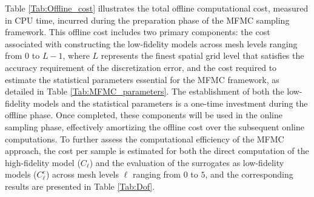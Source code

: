 Table \ref{Tab:Offline_cost} illustrates the total offline computational cost, measured in CPU time, incurred during the preparation phase of the MFMC sampling framework. This offline cost includes two primary components: the cost associated with constructing the low-fidelity models across mesh levels ranging from $0$ to $L-1$, where $L$ represents the finest spatial grid level that satisfies the accuracy requirement of the discretization error, and the cost required to estimate the statistical parameters essential for the MFMC framework, as detailed in Table \ref{Tab:MFMC_parameters}. The establishment of both the low-fidelity models and the statistical parameters is a one-time investment during the offline phase. Once completed, these components will be used in the online sampling phase, effectively amortizing the offline cost over the subsequent online computations. To further assess the computational efficiency of the MFMC approach, the cost per sample is estimated for both the direct computation of the high-fidelity model ($C_\ell$) and the evaluation of the surrogates as low-fidelity models ($C_\ell^e$) across mesh levels $\ell$ ranging from $0$ to $5$, and the corresponding results are presented in Table \ref{Tab:Dof}.





